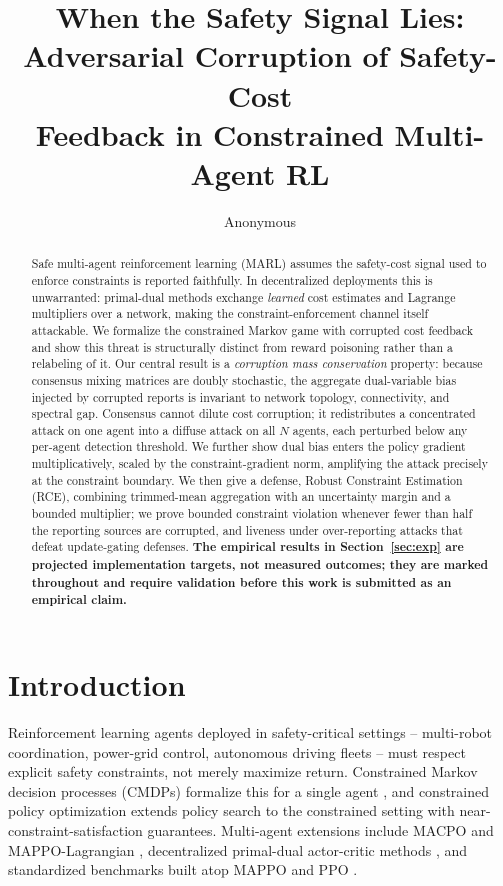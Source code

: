 \documentclass{article}
\title{When the Safety Signal Lies:\\Adversarial Corruption of Safety-Cost\\Feedback in Constrained Multi-Agent RL}
\author{Anonymous}
\begin{document}
\maketitle

\begin{abstract}
Safe multi-agent reinforcement learning (MARL) assumes the safety-cost signal used to enforce constraints is reported faithfully. In decentralized deployments this is unwarranted: primal-dual methods exchange \emph{learned} cost estimates and Lagrange multipliers over a network, making the constraint-enforcement channel itself attackable. We formalize the constrained Markov game with corrupted cost feedback and show this threat is structurally distinct from reward poisoning rather than a relabeling of it. Our central result is a \emph{corruption mass conservation} property: because consensus mixing matrices are doubly stochastic, the aggregate dual-variable bias injected by corrupted reports is invariant to network topology, connectivity, and spectral gap. Consensus cannot dilute cost corruption; it redistributes a concentrated attack on one agent into a diffuse attack on all $N$ agents, each perturbed below any per-agent detection threshold. We further show dual bias enters the policy gradient multiplicatively, scaled by the constraint-gradient norm, amplifying the attack precisely at the constraint boundary. We then give a defense, Robust Constraint Estimation (RCE), combining trimmed-mean aggregation with an uncertainty margin and a bounded multiplier; we prove bounded constraint violation whenever fewer than half the reporting sources are corrupted, and liveness under over-reporting attacks that defeat update-gating defenses. \textbf{The empirical results in Section~\ref{sec:exp} are projected implementation targets, not measured outcomes; they are marked throughout and require validation before this work is submitted as an empirical claim.}
\end{abstract}

\section{Introduction}
\label{sec:intro}

Reinforcement learning agents deployed in safety-critical settings -- multi-robot coordination, power-grid control, autonomous driving fleets -- must respect explicit safety constraints, not merely maximize return. Constrained Markov decision processes (CMDPs) formalize this for a single agent \citep{altman1999cmdp}, and constrained policy optimization \citep{achiam2017cpo,tessler2019rcpo,chow2018lyapunov,stooke2020pid} extends policy search to the constrained setting with near-constraint-satisfaction guarantees. Multi-agent extensions include MACPO and MAPPO-Lagrangian \citep{gu2023macpo}, decentralized primal-dual actor-critic methods \citep{lu2021decentralized,ying2024scalable,kahe2024distributed}, and standardized benchmarks \citep{ji2023safetygym,ray2019benchmarking} built atop MAPPO \citep{yu2022mappo} and PPO \citep{schulman2017ppo}.
\end{document}
